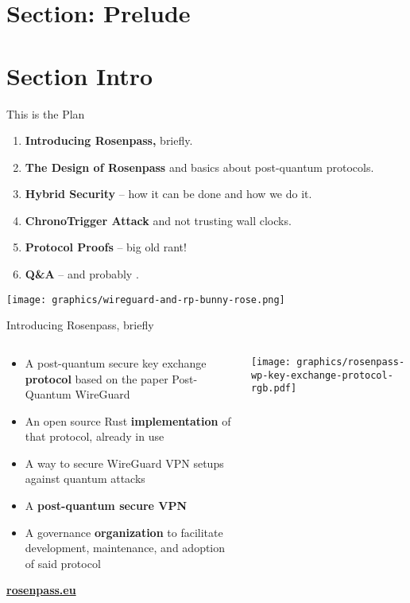 \section{Section: Prelude}

\section{Section Intro}

\begin{frame}[s]{This is the Plan}
  \begin{enumerate}
    \item \textbf{Introducing Rosenpass,} briefly.
    \item \textbf{The Design of Rosenpass} and basics about post-quantum protocols.
    \item \textbf{Hybrid Security} – how it can be done and how we do it.
    \item \textbf{ChronoTrigger Attack} and not trusting wall clocks.
    \item \textbf{Protocol Proofs} – big old rant!
    \item \textbf{Q\&A} – and probably .
  \end{enumerate}

  \begin{center}
    \texttt{[image: graphics/wireguard-and-rp-bunny-rose.png]}
  \end{center}
\end{frame}



\begin{frame}{Introducing Rosenpass, briefly}
  \begin{columns}[fullwidth,c]

    \begin{column}{.5\linewidth}
      \begin{itemize}
        \item A post-quantum secure key exchange \textbf{protocol}
          {\small based on the paper Post-Quantum WireGuard~\citePqwg}
        \item An open source Rust \textbf{implementation} of that protocol, already in use
        \item A way to secure WireGuard VPN setups against quantum attacks
        \item A \textbf{post-quantum secure VPN}
        \item A governance \textbf{organization} to facilitate development, maintenance, and adoption of said protocol
      \end{itemize}
      \bigskip
      \textbf{\url{rosenpass.eu}}
    \end{column}%
    \begin{column}{.5\linewidth}
      \texttt{[image: graphics/rosenpass-wp-key-exchange-protocol-rgb.pdf]}
    \end{column}
  \end{columns}
\end{frame}
